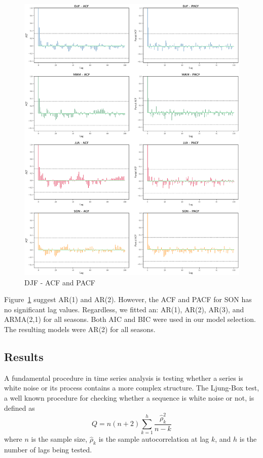 \documentclass[12pt]{article}
\begin{document}
\begin{figure}[!htbp]
  \includegraphics[width=1\textwidth,left]{figs/acfs}
  \caption{DJF - ACF and PACF}\label{acfs}
\end{figure}


Figure~\ref{acfs} suggest AR(1) and AR(2). However, the ACF and PACF for SON has no significant lag values. Regardless, we fitted an: AR(1), AR(2), AR(3), and ARMA(2,1) for all seasons. Both AIC and BIC were used in our model selection. The resulting models were AR(2) for all seasons.

\subsection{Results}
A fundamental procedure in time series analysis is testing whether a series is white noise or its process contains a more complex structure. The Ljung-Box test, a well known procedure for checking whether a sequence is white noise or not, is defined as
$$Q = n(n+2)\sum_{k=1}^{h} \frac{\hat{\rho}_{k}^{2}}{n-k}$$
where $n$ is the sample size, $\hat{\rho}_k$ is the sample autocorrelation at lag $k$, and $h$ is the number of lags being tested.
\end{document}
